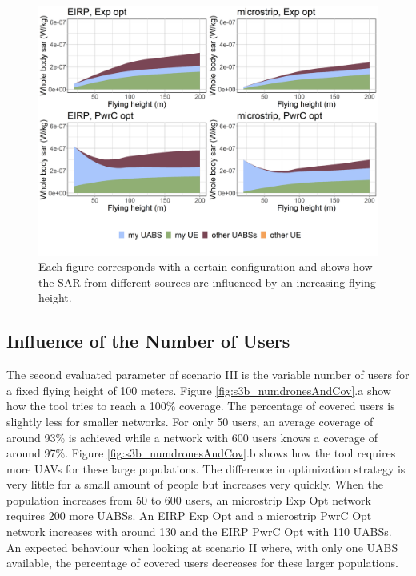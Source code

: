 \begin{figure}[]
  \includegraphics[width=\textwidth]{../results/s3/fhFourSources.png}
  \caption{
  Each figure corresponds with a certain configuration and shows how the \acs{SAR} from different sources are influenced by an increasing flying height.}  
  \label{fig:s3a_fourSourcesMatrix}
\end{figure}

\FloatBarrier
\subsection{Influence of the Number of Users}
\label{S3B}

The second evaluated parameter of scenario III is the variable number of users for a fixed flying height of 100 meters.  
Figure \ref{fig:s3b_numdronesAndCov}.a show how the tool tries to reach a 100\% coverage. The percentage
of covered users is slightly less for smaller networks. For only 50 users, an average 
coverage of around 93\% is achieved while a network with 600 users knows a coverage of around 97\%.
Figure \ref{fig:s3b_numdronesAndCov}.b shows how the tool requires more \gls{UAV}s for these large 
populations. 
The difference in optimization strategy is very little for a small amount of people but increases very quickly. 
When the population increases from 50 to 600 users, an microstrip \gls{Exp Opt} network 
requires 200 more \gls{UABS}s. An \gls{EIRP} \gls{Exp Opt} and a microstrip \gls{PwrC Opt} network 
increases with around 130 and the \gls{EIRP} \gls{PwrC Opt} with 110 \gls{UABS}s.
An expected behaviour  when looking at scenario II where, with only one \gls{UABS} available, 
the percentage of covered users decreases for these larger populations.



